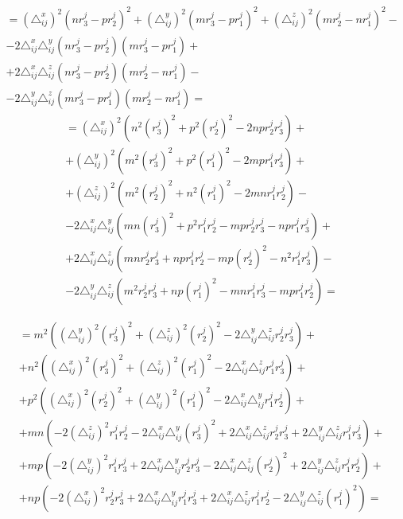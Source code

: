$$\begin{gathered}
	= \left(\triangle_{ij}^x\right)^2 (n r_3^j - p r_2^j)^2  + \left( \triangle_{ij}^y\right)^2 (m r_3^j - p r_1^j)^2  + \left( \triangle_{ij}^z \right)^2 (m r_2^j - n r_1^j)^2 - \\
	- 2 \triangle_{ij}^x \triangle_{ij}^y (n r_3^j - p r_2^j) (m r_3^j - p r_1^j) + \\
	+ 2 \triangle_{ij}^x  \triangle_{ij}^z (n r_3^j - p r_2^j)  (m r_2^j - n r_1^j) - \\
	- 2 \triangle_{ij}^y  \triangle_{ij}^z (m r_3^j - p r_1^j)  (m r_2^j - n r_1^j) =
\end{gathered}$$
\newpage
$$\begin{gathered}
	= \left(\triangle_{ij}^x\right)^2 (n^2 (r_3^j)^2 + p^2 (r_2^j)^2 - 2 n p r_2^j r_3^j)  + \\
	+  \left( \triangle_{ij}^y\right)^2 (m^2 (r_3^j)^2 + p^2 (r_1^j)^2 - 2 m p r_1^j r_3^j)  + \\
	+ \left( \triangle_{ij}^z \right)^2 (m^2 (r_2^j)^2 + n^2 (r_1^j)^2 - 2 m n r_1^j r_2^j) - \\
	- 2 \triangle_{ij}^x \triangle_{ij}^y (m n (r_3^j)^2 + p^2 r_1^j r_2^j - m p r_2^j r_3^j - n p r_1^j r_3^j) + \\
	+ 2 \triangle_{ij}^x  \triangle_{ij}^z (m n r_2^j r_3^j + n p r_1^j r_2^j - m p (r_2^j)^2 - n^2 r_1^j r_3^j) - \\
	- 2 \triangle_{ij}^y  \triangle_{ij}^z (m^2 r_2^j r_3^j + n p (r_1^j)^2 - m n r_1^j r_3^j - m p r_1^j r_2^j) = 
\end{gathered}$$

$$\begin{gathered}
	= m^2 \left( \left( \triangle_{ij}^y\right)^2 (r_3^j)^2 + \left( \triangle_{ij}^z \right)^2 (r_2^j)^2 - 2 \triangle_{ij}^y  \triangle_{ij}^z r_2^j r_3^j \right) + \\
	+ n^2 \left( \left(\triangle_{ij}^x\right)^2 (r_3^j)^2 + \left( \triangle_{ij}^z \right)^2 (r_1^j)^2 - 2 \triangle_{ij}^x  \triangle_{ij}^z r_1^j r_3^j \right) + \\
	+ p^2 \left( \left(\triangle_{ij}^x\right)^2 (r_2^j)^2 + \left( \triangle_{ij}^y\right)^2 (r_1^j)^2 - 2 \triangle_{ij}^x \triangle_{ij}^y r_1^j r_2^j \right) + \\
	+ m n \left( - 2 \left( \triangle_{ij}^z \right)^2 r_1^j r_2^j - 2 \triangle_{ij}^x \triangle_{ij}^y (r_3^j)^2 + 2 \triangle_{ij}^x  \triangle_{ij}^z r_2^j r_3^j + 2 \triangle_{ij}^y  \triangle_{ij}^z r_1^j r_3^j \right) + \\
	+ m p \left( -2 \left( \triangle_{ij}^y\right)^2 r_1^j r_3^j + 2 \triangle_{ij}^x \triangle_{ij}^y r_2^j r_3^j - 2 \triangle_{ij}^x  \triangle_{ij}^z (r_2^j)^2 + 2 \triangle_{ij}^y  \triangle_{ij}^z r_1^j r_2^j \right) + \\
	+ n p \left( -2 \left(\triangle_{ij}^x\right)^2 r_2^j r_3^j + 2 \triangle_{ij}^x \triangle_{ij}^y r_1^j r_3^j + 2 \triangle_{ij}^x  \triangle_{ij}^z r_1^j r_2^j - 2 \triangle_{ij}^y  \triangle_{ij}^z (r_1^j)^2 \right) =
\end{gathered}$$

